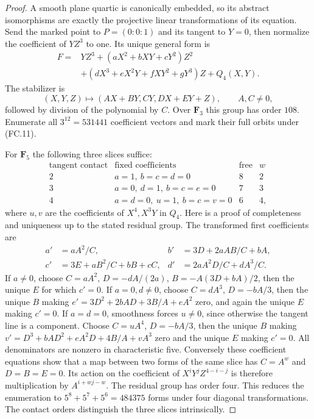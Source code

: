 \begin{proof}
A smooth plane quartic is canonically embedded, so its abstract
isomorphisms are exactly the projective linear transformations of
its equation. Send the marked point to $P=(0:0:1)$ and its tangent
to $Y=0$, then normalize the coefficient of $YZ^3$ to one. Its
unique general form is
\[
\begin{split}
 F={}&YZ^3+(aX^2+bXY+cY^2)Z^2\\
     &+(dX^3+eX^2Y+fXY^2+gY^3)Z+Q_4(X,Y).
\end{split}                                                   \tag{FC.10}
\]
The stabilizer is
\[
 (X,Y,Z)\longmapsto(AX+BY,CY,DX+EY+Z),\qquad A,C\ne0,
                                                               \tag{FC.11}
\]
followed by division of the polynomial by $C$. Over $\mathbf F _3$
this group has order $108$. Enumerate all $3^{12}=531441$ coefficient
vectors and mark their full orbits under (FC.11).

For $\mathbf F _5$ the following three slices suffice:
\[
\begin{array}{c|c|c|c}
\text{tangent contact}&\text{fixed coefficients}&\text{free}&w\\ \hline
2&a=1,\ b=c=d=0&8&2\\
3&a=0,\ d=1,\ b=c=e=0&7&3\\
4&a=d=0,\ u=1,\ b=c=v=0&6&4,
\end{array}
\]
where $u,v$ are the coefficients of $X^4,X^3Y$ in $Q_4$.
Here is a proof of completeness and uniqueness up to the stated
residual group. The transformed first coefficients are
\[
\begin{aligned}
a'&=aA^2/C,&b'&=3D+2aAB/C+bA,\\
c'&=3E+aB^2/C+bB+cC,&d'&=2aA^2D/C+dA^3/C.
\end{aligned}
\]
If $a\ne0$, choose $C=aA^2$, $D=-dA/(2a)$,
$B=-A(3D+bA)/2$, then the unique $E$ for which $c'=0$.
If $a=0,d\ne0$, choose $C=dA^3$, $D=-bA/3$, then the unique
$B$ making $e'=3D^2+2bAD+3B/A+eA^2$ zero, and again the
unique $E$ making $c'=0$.
If $a=d=0$, smoothness forces $u\ne0$, since otherwise the tangent
line is a component. Choose $C=uA^4$, $D=-bA/3$, then the unique
$B$ making $v'=D^3+bAD^2+eA^2D+4B/A+vA^3$ zero and the unique
$E$ making $c'=0$. All denominators are nonzero in characteristic
five. Conversely these coefficient equations show that a map between
two forms of the same slice has $C=A^w$ and $D=B=E=0$.
Its action on the coefficient of $X^iY^jZ^{4-i-j}$ is therefore
multiplication by $A^{i+wj-w}$. The residual group has order four.
This reduces the enumeration to $5^8+5^7+5^6=484375$ forms under
four diagonal transformations. The contact orders distinguish the
three slices intrinsically.


\end{proof}

